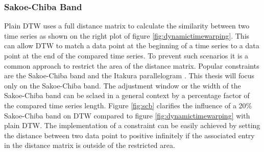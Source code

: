 \subsubsection{Sakoe-Chiba Band} \label{sakoe-chiba_band}
Plain DTW uses a full distance matrix to calculate the similarity between two time series as shown on the right plot of
figure \ref{fig:dynamictimewarping}. This can allow DTW to match a data point at the beginning of a time series to a
data point at the end of the compared time series. To prevent such scenarios it is a common approach to restrict the
area of the distance matrix. Popular constraints are the Sakoe-Chiba band \cite{sakoe1978dynamic} and the Itakura
parallelogram \cite{itakura1975minimum}. This thesis will focus only on the Sakoe-Chiba band. The adjustment window or
the width of the Sakoe-Chiba band can be sclaed in a general context by a percentage factor of the compared time series
length. Figure \ref{fig:scb} clarifies the influence of a 20\% Sakoe-Chiba band on DTW compared to figure
\ref{fig:dynamictimewarping} with plain DTW. The implementation of a constraint can be easily achieved by setting the
distance between two data point to positive infinitely if the associated entry in the distance matrix is outside of the
restricted area.

